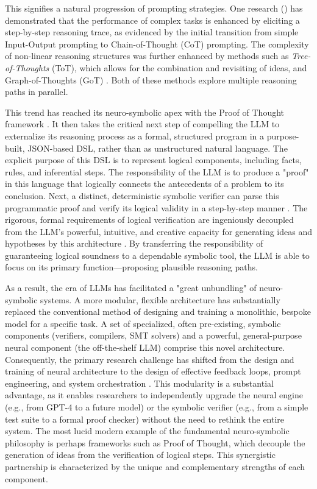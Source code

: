 \documentclass[12pt, a4paper]{report}
\begin{document}
This signifies a natural progression of prompting strategies. One research (\citep{kleinberg2018algorithmic}) has demonstrated that the performance of complex tasks is enhanced by eliciting a step-by-step reasoning trace, as evidenced by the initial transition from simple Input-Output prompting to Chain-of-Thought (CoT) prompting. The complexity of non-linear reasoning structures was further enhanced by methods such as \textit{Tree-of-Thoughts}  (ToT), which allows for the combination and revisiting of ideas, and Graph-of-Thoughts (GoT) \citep{kleinberg2018algorithmic}. Both of these methods explore multiple reasoning paths in parallel.

This trend has reached its neuro-symbolic apex with the Proof of Thought framework \citep{zhang2024proofofthought}. It then takes the critical next step of compelling the LLM to externalize its reasoning process as a formal, structured program in a purpose-built, JSON-based DSL, rather than as unstructured natural language. The explicit purpose of this DSL is to represent logical components, including facts, rules, and inferential steps. The responsibility of the LLM is to produce a "proof" in this language that logically connects the antecedents of a problem to its conclusion. Next, a distinct, deterministic symbolic verifier can parse this programmatic proof and verify its logical validity in a step-by-step manner \citep{zhang2024proofofthought}. The rigorous, formal requirements of logical verification are ingeniously decoupled from the LLM's powerful, intuitive, and creative capacity for generating ideas and hypotheses by this architecture \citep{zhang2024proofofthought}. By transferring the responsibility of guaranteeing logical soundness to a dependable symbolic tool, the LLM is able to focus on its primary function—proposing plausible reasoning paths.

As a result, the era of LLMs has facilitated a "great unbundling" of neuro-symbolic systems. A more modular, flexible architecture has substantially replaced the conventional method of designing and training a monolithic, bespoke model for a specific task. A set of specialized, often pre-existing, symbolic components (verifiers, compilers, SMT solvers) and a powerful, general-purpose neural component (the off-the-shelf LLM) comprise this novel architecture. Consequently, the primary research challenge has shifted from the design and training of neural architecture to the design of effective feedback loops, prompt engineering, and system orchestration \citep{vinyals2019grandmaster}. This modularity is a substantial advantage, as it enables researchers to independently upgrade the neural engine (e.g., from GPT-4 to a future model) or the symbolic verifier (e.g., from a simple test suite to a formal proof checker) without the need to rethink the entire system. The most lucid modern example of the fundamental neuro-symbolic philosophy is perhaps frameworks such as Proof of Thought, which decouple the generation of ideas from the verification of logical steps. This synergistic partnership is characterized by the unique and complementary strengths of each component.
\end{document}
